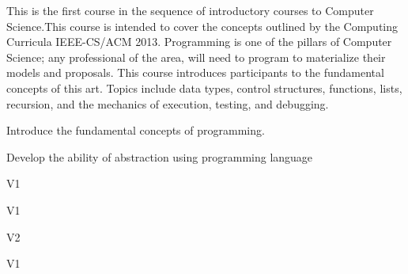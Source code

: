 \begin{syllabus}


\begin{justification}
This is the first course in the sequence of introductory courses to Computer Science.This course is intended to cover the concepts outlined by the
Computing Curricula IEEE-CS/ACM 2013.
Programming is one of the pillars of Computer Science; any professional of the area, will need to program to materialize their models and proposals.
This course introduces participants to the fundamental concepts of this art.
Topics include data types, control structures, functions, lists, recursion, and the mechanics of execution, testing, and debugging.
\end{justification}

\begin{goals}
\item Introduce the fundamental concepts of programming.
\item Develop the ability of abstraction using programming language
\end{goals}

\begin{outcomes}{V1}
    \item {}
    \item {}
\end{outcomes}

\begin{specificoutcomes}{V1}
    \item {}
    \item {}
    \item {}
    \item {}
\end{specificoutcomes}

\begin{outcomes}{V2}
    \item {}
    \item {}
\end{outcomes}

\begin{competences}{V1}
    \item {} 
    \item {} 
\end{competences}


\end{syllabus}
